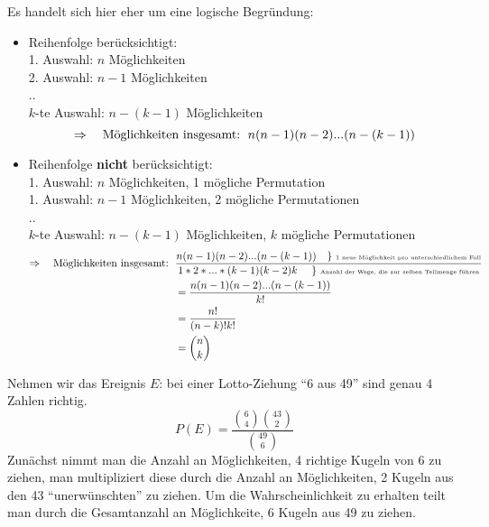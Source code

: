 \documentclass[../MAIN/main.tex]{subfiles}
\begin{document}
\begin{Beweis}
  Es handelt sich hier eher um eine logische Begründung:\\
  \begin{itemize}
    \item Reihenfolge berücksichtigt:\\
    1. Auswahl: $n$ Möglichkeiten\\
    2. Auswahl: $n-1$ Möglichkeiten\\
    ..\\
    $k$-te Auswahl: $n-(k-1)$ Möglichkeiten\\
    $$\Rightarrow \text{\quad Möglichkeiten insgesamt:\, }  n(n-1)(n-2)...(n-(k-1))$$
    \item Reihenfolge \textbf{nicht} berücksichtigt:\\
    1. Auswahl: $n$ Möglichkeiten, 1 mögliche Permutation\\
    1. Auswahl: $n-1$ Möglichkeiten, 2 mögliche Permutationen\\
    ..\\
    $k$-te Auswahl: $n-(k-1)$ Möglichkeiten, $k$ mögliche Permutationen\\
    \begin{align*}
      \Rightarrow \text{\quad Möglichkeiten insgesamt:\, } & \dfrac{n(n-1)(n-2)...(n-(k-1))\text{\quad \} \tiny{1 neue Möglichkeit pro unterschiedlichem Fall}}}{1*2*...*(k-1)(k-2)k \text{ \quad \} \tiny{Anzahl der Wege, die zur selben Teilmenge führen}}}\\
      & = \dfrac{n(n-1)(n-2)...(n-(k-1))}{k!}\\
      & = \dfrac{n!}{(n-k)!k!}\\
      & = {n\choose k}
    \end{align*}
  \end{itemize}
\end{Beweis}
\begin{Beispiel}
  Nehmen wir das Ereignis $E$: bei einer Lotto-Ziehung ``6 aus 49'' sind genau 4 Zahlen richtig.
  $$P(E) = \dfrac{{6 \choose 4}{43 \choose 2}}{{49 \choose 6}}$$
  Zunächst nimmt man die Anzahl an Möglichkeiten, 4 richtige Kugeln von 6 zu ziehen, man multipliziert diese durch die Anzahl an Möglichkeiten, 2 Kugeln aus den 43 ``unerwünschten'' zu ziehen. Um die Wahrscheinlichkeit zu erhalten teilt man durch die Gesamtanzahl an Möglichkeite, 6 Kugeln aus 49 zu ziehen.
\end{Beispiel}
\end{document}
